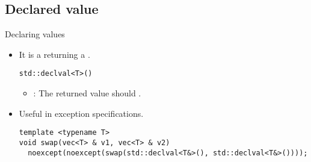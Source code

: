 \subsection{Declared value}

\begin{frame}[t,fragile]{Declaring values}
  \begin{itemize}
    \item It is a  returning a .
\begin{lstlisting}
std::declval<T>()
\end{lstlisting}
      \begin{itemize}
        \pause
        \item {}: The returned value should .
      \end{itemize}
    \pause
    \item Useful in exception specifications.
\begin{lstlisting}
template <typename T>
void swap(vec<T> & v1, vec<T> & v2) 
  noexcept(noexcept(swap(std::declval<T&>(), std::declval<T&>())));
\end{lstlisting}
  \end{itemize}
\end{frame}


